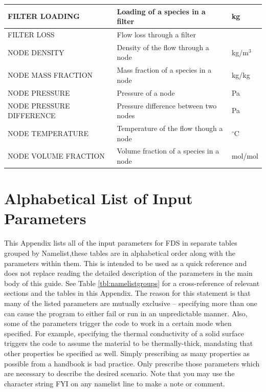 \documentclass[11pt]{book}
\begin{document}
\begin{longtable}{|l|l|l|@{\extracolsep{\fill}}}
{\ct FILTER LOADING}                            & Loading of a species in a filter          &  kg                   \\ \hline
{\ct FILTER LOSS}                               & Flow loss through a filter                &                       \\ \hline
{\ct NODE DENSITY}                              & Density of the flow through a node        &  kg/m$^3$             \\ \hline
{\ct NODE MASS FRACTION}                        & Mass fraction of a species in a node      &  kg/kg                \\ \hline
{\ct NODE PRESSURE}                             & Pressure of a node                        &       Pa              \\ \hline
{\ct NODE PRESSURE DIFFERENCE}                  & Pressure difference between two nodes     &       Pa              \\ \hline
{\ct NODE TEMPERATURE}                          & Temperature of the flow though a node     & $^\circ$C             \\ \hline
{\ct NODE VOLUME FRACTION}                      & Volume fraction of a species in a node    &  mol/mol              \\ \hline
\end{longtable}



\chapter{Alphabetical List of Input Parameters}

This Appendix lists all of the input parameters for FDS in separate tables grouped by Namelist,these tables are in alphabetical order along with the parameters within them. This is intended to be used as a quick reference and does not replace reading the detailed description of the parameters in the main body of this guide. See Table \ref{tbl:namelistgroups} for a cross-reference of relevant sections and the tables in this Appendix. The reason for this statement is that many of the listed parameters are mutually exclusive -- specifying more than one can cause the program to either fail or run in an unpredictable manner. Also, some of the parameters trigger the code to work in a certain mode when specified. For example, specifying the thermal conductivity of a solid surface triggers the code to assume the material to be thermally-thick, mandating that other
properties be specified as well. Simply prescribing as many properties as possible from a handbook is bad practice. Only prescribe those parameters which are necessary to describe the desired scenario. Note that you may use the character string {\ct FYI} on any namelist line to make a note or comment.
\end{document}
